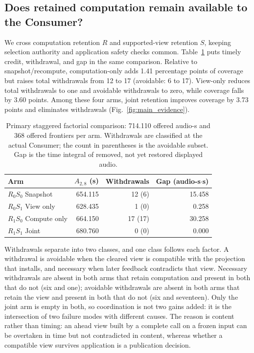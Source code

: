 \subsection{Does retained computation remain available to the Consumer?}
We cross computation retention $R$ and supported-view retention $S$,
keeping selection authority and application safety checks common.
Table~\ref{tab:factorial_tradeoff} puts timely credit, withdrawal, and
gap in the same comparison. Relative to snapshot/recompute, computation-only
adds 1.41 percentage points of coverage but raises total withdrawals
from 12 to 17 (avoidable: 6 to 17). View-only reduces total withdrawals
to one and avoidable withdrawals to zero, while coverage falls by
3.60 points. Among these four arms, joint retention improves coverage
by 3.73 points and eliminates withdrawals
(Fig.~\ref{fig:main_evidence}).

\begin{table}[t]
\centering
\caption{Primary staggered factorial comparison: 714.110 offered
audio-s and 368 offered frontiers per arm. Withdrawals are classified
at the actual Consumer; the count in parentheses is the avoidable
subset. Gap is the time integral of removed, not yet restored
displayed audio.}
\label{tab:factorial_tradeoff}
\begingroup\small\setlength{\tabcolsep}{2.5pt}
\begin{tabular}{@{}lrrr@{}}
\toprule
Arm & $A_{2,8}$ (s) & Withdrawals & Gap (audio-s$\cdot$s)\\
\midrule
$R_0S_0$ Snapshot & 654.115 & 12 (6) & 15.458\\
$R_0S_1$ View only & 628.435 & 1 (0) & 0.258\\
$R_1S_0$ Compute only & 664.150 & 17 (17) & 30.258\\
$R_1S_1$ Joint & 680.760 & 0 (0) & 0.000\\
\bottomrule
\end{tabular}\endgroup
\end{table}

Withdrawals separate into two classes, and one class follows each
factor. A withdrawal is avoidable when the cleared view is compatible
with the projection that installs, and necessary when later feedback
contradicts that view. Necessary withdrawals are absent in both arms
that retain computation and present in both that do not (six and one);
avoidable withdrawals are absent in both arms that retain the view and
present in both that do not (six and seventeen). Only the joint arm is
empty in both, so coordination is not two gains added: it is the
intersection of two failure modes with different causes. The reason is
content rather than timing: an ahead view built by a complete call on a
frozen input can be overtaken in time but not contradicted in content,
whereas whether a compatible view survives application is a publication
decision.

